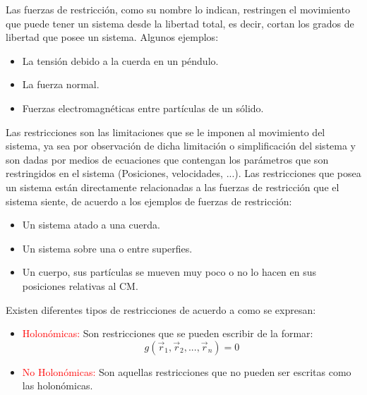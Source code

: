 \documentclass[/home/hernan/Documentos/Apuntes_mecanica_teorica/main.tex]{subfiles}
\begin{document}
    \begin{definition}
        Las fuerzas de restricción, como su nombre lo indican, restringen el movimiento que puede tener un sistema desde la libertad total, es decir, cortan los grados de libertad que posee un sistema. Algunos ejemplos:
        \begin{itemize}
            \item La tensión debido a la cuerda en un péndulo.
            \item La fuerza normal.
            \item Fuerzas electromagnéticas entre partículas de un sólido.
        \end{itemize}
    \end{definition}

    \begin{definition}
        Las restricciones son las limitaciones que se le imponen al movimiento del sistema, ya sea por observación de dicha limitación o simplificación del sistema y son dadas por medios de ecuaciones que contengan los parámetros que son restringidos en el sistema (Posiciones, velocidades, ...). Las restricciones que posea un sistema están directamente relacionadas a las fuerzas de restricción que el sistema siente, de acuerdo a los ejemplos de fuerzas de restricción:

        \begin{itemize}
            \item Un sistema atado a una cuerda.
            \item Un sistema sobre una o entre superfies.
            \item Un cuerpo, sus partículas se mueven muy poco o no lo hacen en sus posiciones relativas al CM.
        \end{itemize}
        
        Existen diferentes tipos de restricciones de acuerdo a como se expresan:

        \begin{itemize}
            \item \textcolor{red}{Holonómicas:} Son restricciones que se pueden escribir de la formar: 
                \begin{equation}
                    g\left(\vec{r}_{1},\vec{r}_{2}, ...,\vec{r}_{n}\right) = 0
                \end{equation}
            \item \textcolor{red}{No Holonómicas:} Son aquellas restricciones que no pueden ser escritas como las holonómicas.
        \end{itemize}


\end{definition}
\end{document}
